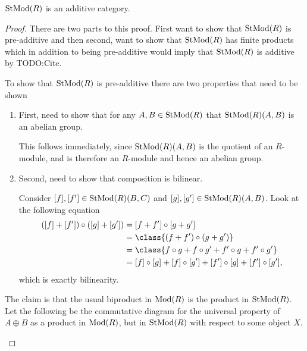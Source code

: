 \begin{lemma}
    \( \operatorname{StMod}(R) \) is an additive category.
\end{lemma}
\begin{proof}
    There are two parts to this proof. First want to show that \( \operatorname{StMod}(R) \) is pre-additive and then second, want to show that \( \operatorname{StMod}(R) \) has finite products which in addition to being pre-additive would imply that \( \operatorname{StMod}(R) \) is additive by TODO:Cite.

    To show that \( \operatorname{StMod}(R) \) is pre-additive there are two properties that need to be shown
    \begin{enumerate}
        \item {
            First, need to show that for any \( A, B \in \operatorname{StMod}(R) \) that \( \operatorname{StMod}(R)(A, B) \) is an abelian group.

            This follows immediately, since \( \operatorname{StMod}(R)(A, B) \) is the quotient of an \( R \)-module, and is therefore an \( R \)-module and hence an abelian group.
        }
        \item {
            Second, need to show that composition is bilinear.

            Consider \( [f], [f'] \in \operatorname{StMod}(R)(B, C) \) and \( [g], [g'] \in \operatorname{StMod}(R)(A, B) \). Look at the following equation
            \begin{align*}
                ([f] + [f']) \circ ([g] + [g']) &= [f + f'] \circ [g + g'] \\
                &= \class{(f + f') \circ (g + g')} \\
                &= \class{f \circ g + f \circ g' + f' \circ g + f' \circ g'} \\
                &= [f] \circ [g] + [f] \circ [g'] + [f'] \circ [g] + [f'] \circ [g'],
            \end{align*}
            which is exactly bilinearity.
        }
    \end{enumerate}

    The claim is that the usual biproduct in \( \operatorname{Mod}(R) \) is the product in \( \operatorname{StMod}(R) \). Let the following be the commutative diagram for the universal property of \( A \oplus B \) as a product in \( \operatorname{Mod}(R) \), but in \( \operatorname{StMod}(R) \) with respect to some object \( X \).
    \begin{center}
\end{center}
\end{proof}
